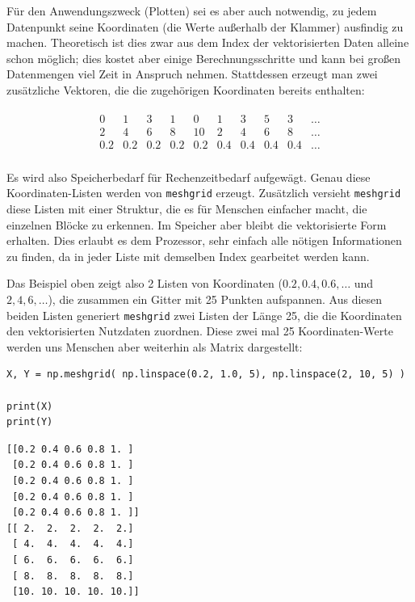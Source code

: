 Für den Anwendungszweck (\eg Plotten) sei es aber auch notwendig, zu jedem Datenpunkt seine Koordinaten (die Werte außerhalb der Klammer) ausfindig zu machen. Theoretisch ist dies zwar aus dem Index der vektorisierten Daten alleine schon möglich; dies kostet aber einige Berechnungsschritte und kann bei großen Datenmengen viel Zeit in Anspruch nehmen. Stattdessen erzeugt man zwei zusätzliche Vektoren, die die zugehörigen Koordinaten bereits enthalten:

\begin{align*}
	\begin{matrix}
		0   &   1 &   3 &   1 &   0 &   1 &   3 & 5   &   3 & \ldots \\
		 2  &  4  &  6  &  8  &  10 &  2  &  4  &  6  &  8  & \ldots \\
		0.2 & 0.2 & 0.2 & 0.2 & 0.2 & 0.4 & 0.4 & 0.4 & 0.4 & \ldots \\
	\end{matrix}
\end{align*}

Es wird also Speicherbedarf für Rechenzeitbedarf aufgewägt. Genau diese Koordinaten-Listen werden von \texttt{meshgrid} erzeugt. Zusätzlich versieht \texttt{meshgrid} diese Listen mit einer Struktur, die es für Menschen einfacher macht, die einzelnen Blöcke zu erkennen. Im Speicher aber bleibt die vektorisierte Form erhalten. Dies erlaubt es dem Prozessor, sehr einfach alle nötigen Informationen zu finden, da in jeder Liste mit demselben Index gearbeitet werden kann.

Das Beispiel oben zeigt also 2 Listen von Koordinaten ($0.2, 0.4, 0.6, \ldots$ und $2, 4, 6, \ldots$), die zusammen ein Gitter mit 25 Punkten aufspannen. Aus diesen beiden Listen generiert \texttt{meshgrid} zwei Listen der Länge 25, die die Koordinaten den vektorisierten Nutzdaten zuordnen. Diese zwei mal 25 Koordinaten-Werte werden uns Menschen aber weiterhin als Matrix dargestellt:

\begin{codebox}
\begin{verbatim}
X, Y = np.meshgrid( np.linspace(0.2, 1.0, 5), np.linspace(2, 10, 5) )

print(X)
print(Y)
\end{verbatim}
\end{codebox}

\begin{cmdbox}
\begin{verbatim}
[[0.2 0.4 0.6 0.8 1. ]
 [0.2 0.4 0.6 0.8 1. ]
 [0.2 0.4 0.6 0.8 1. ]
 [0.2 0.4 0.6 0.8 1. ]
 [0.2 0.4 0.6 0.8 1. ]]
[[ 2.  2.  2.  2.  2.]
 [ 4.  4.  4.  4.  4.]
 [ 6.  6.  6.  6.  6.]
 [ 8.  8.  8.  8.  8.]
 [10. 10. 10. 10. 10.]]
\end{verbatim}
\end{cmdbox}

